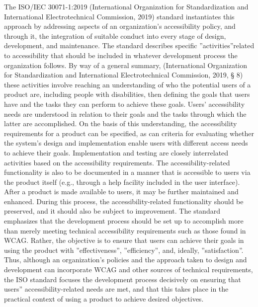 \documentclass{sig-alternate} %
\begin{document}
\begin{large}
The ISO/IEC 30071-1:2019 (International Organization for Standardization and International Electrotechnical Commission, 2019) standard instantiates this approach by addressing aspects of an organization’s accessibility policy, and through it, the integration of suitable conduct into every stage of design, development, and maintenance. The standard describes specific ”activities”related to accessibility that should be included in whatever development process the organization follows. By way of a general summary, (International Organization for Standardization and International Electrotechnical Commission, 2019, § 8) these activities involve reaching an understanding of who the potential users of a product are, including people with disabilities, then defining the goals that users have and the tasks they can perform to achieve these goals. Users’ accessibility needs are understood in relation to their goals and the tasks through which the latter are accomplished. On the basis of this understanding, the accessibility requirements for a product can be specified, as can criteria for evaluating whether the system’s design and implementation enable users with different access needs to achieve their goals. Implementation and testing are closely interrelated activities based on the accessibility requirements. The accessibility-related functionality is also to be documented in a manner that is accessible to users via the product itself (e.g., through a help facility included in the user interface). After a product is made available to users, it may be further maintained and enhanced. During this process, the accessibility-related functionality should be preserved, and it should also be subject to improvement. The standard emphasizes that the development process should be set up to accomplish more than merely meeting technical accessibility requirements such as those found in WCAG. Rather, the objective is to ensure that users can achieve their goals in using the product with ”effectiveness”, ”efficiency”, and, ideally, ”satisfaction”. Thus, although an organization’s policies and the approach taken to design and development can incorporate WCAG and other sources of technical requirements, the ISO standard focuses the development process decisively on ensuring that users” accessibility-related needs are met, and that this takes place in the practical context of using a product to achieve desired objectives.


\end{large}
\end{document}
